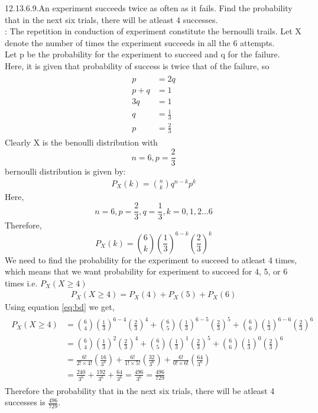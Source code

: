 \documentclass[journal,12pt,twocolumn]{IEEEtran}
\begin{document}
\renewcommand{\thefigure}{\theenumi}
\renewcommand{\thetable}{\theenumi}
12.13.6.9.An experiment succeeds twice as often as it fails. Find the probability that in the next six trials, there will be atleast 4 successes.
\\ \solution:
The repetition in conduction of experiment constitute the bernoulli trails. Let X denote the number of times the experiment succeeds in all the 6 attempts.\\
Let p be the probability for the experiment to succeed and q for the failure.\\
Here, it is given that probability of success is twice that of the failure, so 
\begin{align}
\begin{split}
p&=2q\\
p+q&=1\\
3q&=1\\
q&= \frac{1}{3}\\
p&= \frac{2}{3}
\end{split}
\end{align} 
Clearly X is the benoulli distribution with $$n=6, p=\frac{2}{3}$$
bernoulli distribution is given by:
\begin{align}
P_X(k) = \binom{n}{k}q^{n-k}p^{k}
\end{align}
Here, $$n=6, p= \frac{2}{3}, q= \frac{1}{3}, k= 0,1,2...6$$
Therefore,
\begin{equation}
\label{eq:bd}
P_X(k) = \binom{6}{k}\left(\frac{1}{3}\right)^{6-k}\left(\frac{2}{3}\right)^{k}
\end{equation}
We need to find the probability for the experiment to succeed to atleast 4 times, which means that we want probability for experiment to succeed for 4, 5, or 6 times i.e. $P_X(X \ge 4)$
\begin{align}
P_X(X \ge 4)= P_X(4)+ P_X(5)+ P_X(6)
\end{align}
Using equation \ref{eq:bd} we get,
\begin{align}
\begin{split}
P_X(X \ge 4)&= \binom{6}{4}\left(\frac{1}{3}\right)^{6-4}\left(\frac{2}{3}\right)^{4}+ \binom{6}{5}\left(\frac{1}{3}\right)^{6-5}\left(\frac{2}{3}\right)^{5}+ \binom{6}{6}\left(\frac{1}{3}\right)^{6-6}\left(\frac{2}{3}\right)^{6}\\
&=\binom{6}{4}\left(\frac{1}{3}\right)^{2}\left(\frac{2}{3}\right)^{4}+ \binom{6}{5}\left(\frac{1}{3}\right)^{1}\left(\frac{2}{3}\right)^{5}+ \binom{6}{6}\left(\frac{1}{3}\right)^{0}\left(\frac{2}{3}\right)^{6}\\
&=\frac{6!}{2!\times 4!}\left(\frac{16}{3^{6}}\right)+ \frac{6!}{1!\times 5!}\left(\frac{32}{3^{6}}\right)+ \frac{6!}{0!\times 6!}\left(\frac{64}{3^{6}}\right)\\
&= \frac{240}{3^{6}}+ \frac{192}{3^{6}}+ \frac{64}{3^{6}}= \frac{496}{3^{6}}= \frac{496}{729}
\end{split}
\end{align}
Therefore the probability that in the next six trials, there will be atleast 4 successes is $\frac{496}{729}$.
\end{document}
